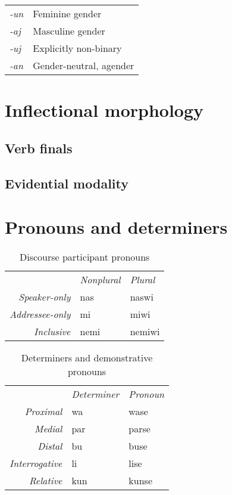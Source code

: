 \documentclass[a4paper,10pt,twoside,openright]{memoir}
\begin{document}
\begin{table}[ht]
    \centering
    \begin{tabular}{>{\em}ll}
    -un & Feminine gender \\
    -aj & Masculine gender \\
    -uj & Explicitly non-binary \\
    -an & Gender-neutral, agender \\
    \end{tabular}
\end{table}



\section{Inflectional morphology}

\subsection{Verb finals}

\subsection{Evidential modality}

\section{Pronouns and determiners}

\begin{table}[ht]
    \centering
    \begin{tabular}{rll}
        & \textit{Nonplural} & \textit{Plural} \\
    \textit{Speaker-only} & nas & naswi \\
    \textit{Addressee-only} & mi & miwi \\
    \textit{Inclusive} & nemi & nemiwi \\
    \end{tabular}
    \caption{Discourse participant pronouns}
    \label{tab:firstandsecond}
\end{table}

\begin{table}[ht]
    \centering
    \begin{tabular}{>{\em}rll}
        & \textit{Determiner} & \textit{Pronoun}  \\
    Proximal & wa & wase \\
    Medial & par & parse \\
    Distal & bu & buse \\
    Interrogative & li & lise \\
    Relative & kun & kunse 
    \end{tabular}
    \caption{Determiners and demonstrative pronouns}
    \label{tab:determiners}
\end{table}
\end{document}
